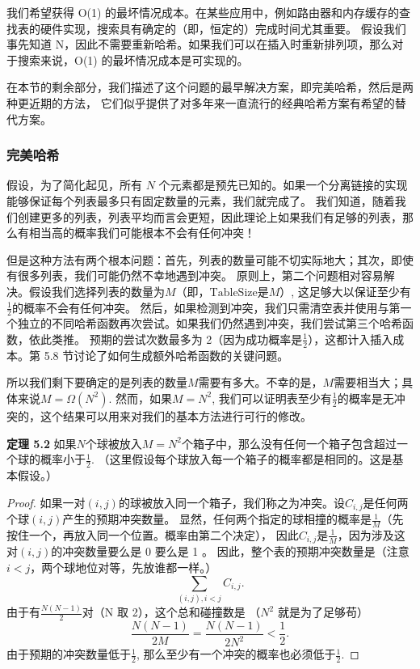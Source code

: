 \documentclass[a4paper]{ctexart}
\theoremstyle{definition}
\theoremstyle{definition}
\begin{document}
我们希望获得 O(1) 的最坏情况成本。在某些应用中，例如路由器和内存缓存的查找表的硬件实现，搜索具有确定的（即，恒定的）完成时间尤其重要。
假设我们事先知道 N，因此不需要重新哈希。如果我们可以在插入时重新排列项，那么对于搜索来说，O(1) 的最坏情况成本是可实现的。

在本节的剩余部分，我们描述了这个问题的最早解决方案，即完美哈希，然后是两种更近期的方法，
它们似乎提供了对多年来一直流行的经典哈希方案有希望的替代方案。

\subsubsection{完美哈希}

假设，为了简化起见，所有 \( N \) 个元素都是预先已知的。如果一个分离链接的实现能够保证每个列表最多只有固定数量的元素，我们就完成了。
我们知道，随着我们创建更多的列表，列表平均而言会更短，因此理论上如果我们有足够的列表，那么有相当高的概率我们可能根本不会有任何冲突！

但是这种方法有两个根本问题：首先，列表的数量可能不切实际地大；其次，即使有很多列表，我们可能仍然不幸地遇到冲突。
原则上，第二个问题相对容易解决。假设我们选择列表的数量为\( M \)（即，\( \text{TableSize} \)是\( M \)）, 这足够大以保证至少有\( \frac{1}{2} \)的概率不会有任何冲突。
然后，如果检测到冲突，我们只需清空表并使用与第一个独立的不同哈希函数再次尝试。如果我们仍然遇到冲突，我们尝试第三个哈希函数，依此类推。
预期的尝试次数最多为 2（因为成功概率是\( \frac{1}{2} \)），这都计入插入成本。第 5.8 节讨论了如何生成额外哈希函数的关键问题。

所以我们剩下要确定的是列表的数量\( M \)需要有多大。不幸的是，\( M \)需要相当大；具体来说\( M = \Omega(N^2) \). 
然而，如果\( M = N^2 \), 我们可以证明表至少有\( \frac{1}{2} \)的概率是无冲突的，这个结果可以用来对我们的基本方法进行可行的修改。

\textbf{定理 5.2} 如果\( N \)个球被放入\( M = N^2 \)个箱子中，那么没有任何一个箱子包含超过一个球的概率小于\( \frac{1}{2} \).
（这里假设每个球放入每一个箱子的概率都是相同的。这是基本假设。）
\begin{proof}
  如果一对\( (i, j) \)的球被放入同一个箱子，我们称之为冲突。设\( C_{i,j} \)是任何两个球\( (i, j) \)产生的预期冲突数量。
  显然，任何两个指定的球相撞的概率是\( \frac{1}{M} \)（先按住一个，再放入同一个位置。概率由第二个决定），
  因此\( C_{i,j} \)是\( \frac{1}{M} \)，因为涉及这对\( (i, j) \)的冲突数量要么是 0 要么是 1 。
  因此，整个表的预期冲突数量是（注意 $i < j$，两个球地位对等，先放谁都一样。）
  $$
  \sum_{(i,j), i<j} C_{i,j}.
  $$
  由于有\( \frac{N(N-1)}{2} \)对（N 取 2），这个总和碰撞数是 （$N^2$ 就是为了足够苟）
  $$ 
  \frac{N(N-1)}{2M} = \frac{N(N-1)}{2N^2} < \frac{1}{2}.
  $$
  由于预期的冲突数量低于\( \frac{1}{2} \), 那么至少有一个冲突的概率也必须低于\( \frac{1}{2} \).
\end{proof} 
\end{document}
